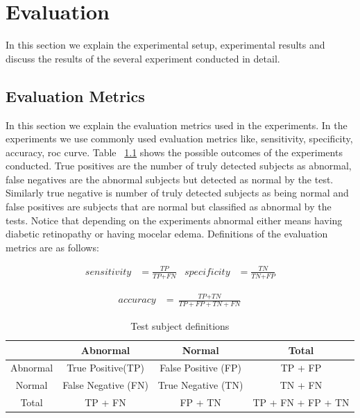 \chapter{Evaluation}

In this section we explain the experimental setup, experimental results and discuss the results of the several experiment conducted in detail. 

\section{Evaluation Metrics}
In this section we explain the evaluation metrics used in the experiments. In the experiments we use commonly used evaluation metrics like, sensitivity, specificity, accuracy, roc curve. Table ~\ref{tab:configs} shows the possible outcomes of the experiments conducted. True positives are the number of truly detected subjects as abnormal, false negatives are the abnormal subjects but detected as normal by the test. Similarly true negative is number of truly detected subjects as being normal and false positives are subjects that are normal but classified as abnormal by the tests. Notice that depending on the experiments abnormal either means having diabetic retinopathy or having mocelar edema. Definitions of the evaluation metrics are as follows: 

\begin{align*}
    \textit{sensitivity} &= \frac{\textit{TP}}{\textit{TP} + \textit{FN}}
    &
    \textit{specificity} &= \frac{\textit{TN}}{\textit{TN} + \textit{FP}}
\end{align*}

\begin{align*}
    \textit{accuracy} &= \frac{\textit{TP} + \textit{TN}}{\textit{TP} + \textit{FP} + \textit{TN} + \textit{FN}}
\end{align*}

\begin{table}[t]
\centering
\caption{Test subject definitions} 
\label{tab:configs}
\begin{tabular}{|c|c|c|c|} \hline
     & Abnormal & Normal & Total  \\ \hline
     Abnormal& True Positive(TP) & False Positive (FP) & TP + FP \\ \hline
     Normal & False Negative (FN) & True Negative (TN) & TN + FN \\ \hline
     Total & TP + FN &  FP + TN & TP + FN + FP + TN \\ \hline
\end{tabular}
\end{table}

